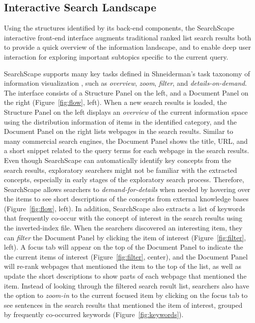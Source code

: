 \subsection{Interactive Search Landscape}

Using the structures identified by its back-end components, the SearchScape interactive front-end interface augments traditional ranked list search results both to provide a quick overview of the information landscape, and to enable deep user interaction for exploring important subtopics specific to the current query. 

%


SearchScape supports many key tasks defined in Shneiderman's task taxonomy of information visualization \cite{shneiderman1996eyes}, such as \emph{overview}, \emph{zoom}, \emph{filter}, and \emph{details-on-demand}. The interface consists of a Structure Panel on the left, and a Document Panel on the right (Figure~\ref{fig:flow}, left). When a new search results is loaded, the Structure Panel on the left displays an \emph{overview} of the current information space using the distribution information of items in the identified category, and the Document Panel on the right lists webpages in the search results. Similar to many commercial search engines, the Document Panel shows the title, URL, and a short snippet related to the query terms for each webpage in the search results. Even though SearchScape can automatically identify key concepts from the search results, exploratory searchers might not be familiar with the extracted concepts, especially in early stages of the exploratory search process. Therefore, SearchScape allows searchers to \emph{demand-for-details} when needed by hovering over the items to see short descriptions of the concepts from external knowledge bases (Figure~\ref{fig:flow}, left). In addition, SearchScape also extracts a list of keywords that frequently co-occur with the concept of interest in the search results using the inverted-index file. When the searchers discovered an interesting item, they can \emph{filter} the Document Panel by clicking the item of interest (Figure~\ref{fig:filter}, left). A focus tab will appear on the top of the Document Panel to indicate the the current items of interest (Figure~\ref{fig:filter}, center), and the Document Panel will re-rank webpages that mentioned the item to the top of the list, as well as update the short descriptions to show parts of each webpage that mentioned the item. Instead of looking through the filtered search result list, searchers also have the option to \emph{zoom-in} to the current focused item by clicking on the focus tab to see sentences in the search results that mentioned the item of interest, grouped by frequently co-occurred keywords (Figure~\ref{fig:keywords}).

